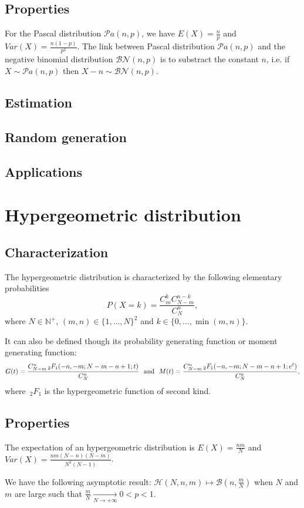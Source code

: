 \subsection{Properties}
For the Pascal distribution $\mathcal Pa(n,p)$, we have
$E(X) = \frac{n}{p}$ and $Var(X)=\frac{n(1-p)}{p^2}$. The link between Pascal distribution $\mathcal Pa(n,p)$ and the negative binomial distribution $\mathcal B\mathcal N(n,p)$ is to substract the constant $n$, i.e. if $X\sim \mathcal Pa(n,p)$ then $X-n\sim \mathcal B\mathcal N(n,p)$.
\subsection{Estimation}
\subsection{Random generation}
\subsection{Applications}

\section{Hypergeometric distribution}
\subsection{Characterization}
The hypergeometric distribution is characterized by the following elementary probabilities
$$
P(X=k) =\frac{C_m^kC_{N-m}^{n-k}}{C_N^n},
$$
where $N\in\mathbb N^+$, $(m,n)\in\{1,\dots, N\}^2$ and $k\in \{0,\dots,\min(m,n)\}$. 

It can also be defined though its probability generating function or moment generating function:
$$
G(t) = \frac{C_{N-m}^n\,_2F_1 (-n,-m;N-m-n+1; t) }{C_N^n} \textrm{~~and~~} M(t) =\frac{C_{N-m}^n \,_2F_1 (-n,-m;N-m-n+1;e^t)}{C_N^n},
$$
where $\,_2F_1$ is the hypergeometric function of second kind.

\subsection{Properties}
The expectation of an hypergeometric distribution is $E(X) = \frac{nm}{N}$ and $Var(X)=\frac{nm(N-n)(N-m)}{N^2(N-1)}$.

We have the following asymptotic result: $\mathcal H(N,n,m) \mapsto \mathcal B(n,\frac{m}{N})$ when $N$ and $m$ are large such that $\frac{m}{N} \underset{N\rightarrow +\infty}{\longrightarrow} 0<p<1$.

